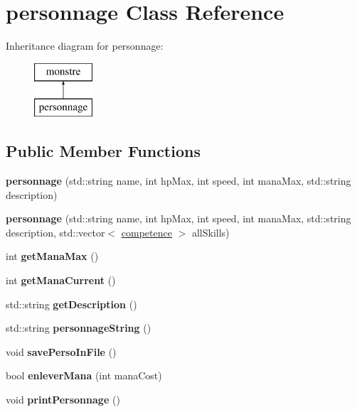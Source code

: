\hypertarget{classpersonnage}{}\section{personnage Class Reference}
\label{classpersonnage}
Inheritance diagram for personnage\+:\begin{figure}[H]
\begin{center}
\leavevmode
\includegraphics[height=2.000000cm]{classpersonnage}
\end{center}
\end{figure}
\subsection*{Public Member Functions}
\begin{DoxyCompactItemize}
\item 
\mbox{\label{classpersonnage_a76ed1134fdaa1dd324e5ee8268a2ab1d}} 
{\bfseries personnage} (std\+::string name, int hp\+Max, int speed, int mana\+Max, std\+::string description)
\item 
\mbox{\label{classpersonnage_ab439cf333698805523acff6e1b870c0e}} 
{\bfseries personnage} (std\+::string name, int hp\+Max, int speed, int mana\+Max, std\+::string description, std\+::vector$<$ \hyperlink{classcompetence}{competence} $>$ all\+Skills)
\item 
\mbox{\label{classpersonnage_ad7e16ec80e6339309f1acc579b8108e1}} 
int {\bfseries get\+Mana\+Max} ()
\item 
\mbox{\label{classpersonnage_a0a1c3d6ae4ffad103cb5ecf9f97b83a3}} 
int {\bfseries get\+Mana\+Current} ()
\item 
\mbox{\label{classpersonnage_a3073012aade0ea1d809f39bc29681f88}} 
std\+::string {\bfseries get\+Description} ()
\item 
\mbox{\label{classpersonnage_aaec203345eb344e180ead34612431267}} 
std\+::string {\bfseries personnage\+String} ()
\item 
\mbox{\label{classpersonnage_a50d0149c0f5d1aaa7375646c3bb2ab2b}} 
void {\bfseries save\+Perso\+In\+File} ()
\item 
\mbox{\label{classpersonnage_a0cb9b3d7d2c2decae742de8086f28766}} 
bool {\bfseries enlever\+Mana} (int mana\+Cost)
\item 
\mbox{\label{classpersonnage_a173f1b07d9098a96fd189ede2e7dad59}} 
void {\bfseries print\+Personnage} ()
\end{DoxyCompactItemize}
